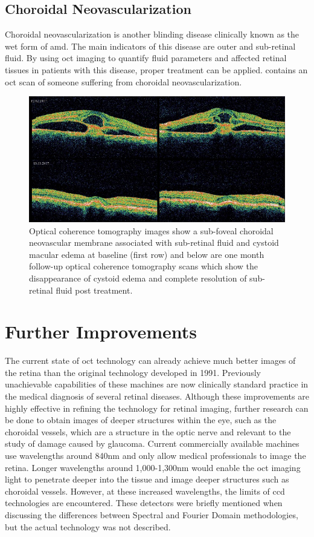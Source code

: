 \subsection{Choroidal Neovascularization}
Choroidal neovascularization is another blinding disease clinically known as the wet form of \Gls{amd}.  The main indicators of this disease are outer and sub-retinal fluid. \cite{mbib_4}  By using \Gls{oct} imaging to quantify fluid parameters and affected retinal tissues in patients with this disease, proper treatment can be applied.\cite{mbib_4}  contains an \Gls{oct} scan of someone suffering from choroidal neovascularization.

\begin{figure}[H]
\centering
\includegraphics{figures/morgan_8}
\caption{ Optical coherence tomography images show a sub-foveal choroidal neovascular membrane associated with sub-retinal fluid and cystoid macular edema at baseline (first row) and below are one month follow-up optical coherence tomography scans which show the disappearance of cystoid edema and complete resolution of sub-retinal fluid post treatment. \cite{mbib_11} }
\label{fig:m_8}
\end{figure}

\section{Further Improvements}
The current state of \Gls{oct} technology can already achieve much better images
of the retina than the original technology developed in 1991.  Previously 
unachievable capabilities of these machines are now clinically standard practice 
in the medical diagnosis of several retinal diseases.  Although these
improvements are highly effective in refining the technology for retinal 
imaging, further research can be done to obtain images of deeper structures 
within the eye, such as the choroidal vessels, which are a structure in the optic 
nerve and relevant to the study of damage caused by glaucoma. \cite{mbib_4} 
Current commercially available machines use wavelengths around 840nm
and only allow medical professionals to image the retina.  Longer wavelengths 
around 1,000-1,300nm would enable the \Gls{oct} imaging light to penetrate deeper 
into the tissue and image deeper structures such as choroidal vessels. 
\cite{mbib_4}  However, at these increased wavelengths, the limits of \Gls{ccd}
technologies are encountered.  These detectors were briefly mentioned when discussing the differences between Spectral 
and Fourier Domain methodologies, but the actual technology was not 
described. 
 
